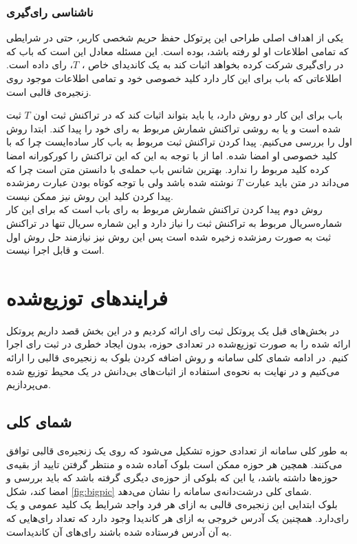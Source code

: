 \subsubsection{ناشناسی رای‌گیری}
یکی از اهداف اصلی طراحی این پرتوکل حفظ حریم شخصی کاربر، حتی در شرایطی که تمامی اطلاعات او لو رفته باشد، بوده است. این مسئله معادل این است که باب که در رای‌گیری شرکت کرده بخواهد اثبات کند به یک کاندیدای خاص ، $T$، رای داده است. اطلاعاتی که باب برای این کار دارد کلید خصوصی خود و تمامی اطلاعات موجود روی زنجیره‌ی قالبی است. 
\par 
باب برای این کار دو روش دارد، یا باید بتواند اثبات کند که در تراکنش ثبت اون $T$ ثبت شده است و یا به روشی تراکنش شمارش مربوط به رای خود را پیدا کند. ابتدا روش اول را بررسی می‌کنیم. پیدا کردن تراکنش ثبت مربوط به باب کار ساده‌ایست چرا که با کلید خصوصی او امضا شده. اما از با توجه به این که این تراکنش را کورکورانه امضا کرده کلید مربوط را ندارد. بهترین شانس باب حمله‌ی با دانستن متن
 است چرا که می‌داند در متن باید عبارت $T$ نوشته شده باشد ولی با توجه کوتاه بودن عبارت رمزشده پیدا کردن کلید این روش نیز ممکن نیست. 
 \\
 روش دوم پیدا کردن تراکنش شمارش مربوط به رای باب است که برای این کار شماره‌سریال مربوط به تراکنش ثبت را نیاز دارد و این شماره سریال تنها در تراکنش ثبت به صورت رمزشده زخیره شده است پس این روش نیز نیازمند حل روش اول است و قابل اجرا نیست. 
\section{فرایند‌های توزیع‌شده}
در بخش‌های قبل یک پروتکل ثبت رای‌ ارائه کردیم و در این بخش قصد داریم پروتکل ارائه شده را به صورت توزیع‌شده در تعدادی حوزه، بدون ایجاد خطری در ثبت رای اجرا کنیم. در ادامه شمای کلی سامانه و روش‌ اضافه کردن بلوک به زنجیره‌ی قالبی را ارائه می‌کنیم و در نهایت به نحوه‌ی استفاده از اثبات‌های بی‌دانش در یک محیط توزیع شده می‌پردازیم.
\subsection{شمای کلی}
به طور کلی سامانه از تعدادی حوزه‌ تشکیل می‌شود که روی یک زنجیره‌ی قالبی توافق می‌کنند. همچین هر حوزه ممکن است بلوک‌ آماده شده و منتظر گرفتن تایید از بقیه‌ی حوزه‌ها داشته باشد، یا این که بلوکی از حوزه‌ی دیگری گرفته باشد که باید بررسی و امضا کند، شکل \ref{fig:bigpic} شمای کلی درشت‌دانه‌ی سامانه را نشان می‌دهد.
\\
بلوک ابتدایی این زنجیره‌ی قالبی به ازای هر فرد واجد شرایط یک کلید عمومی و یک رای‌دارد. همچنین یک آدرس خروجی به ازای هر کاندیدا وجود دارد که تعداد رای‌هایی که به آن آدرس فرستاده شده باشند رای‌های آن‌ کاندیداست. 
 

